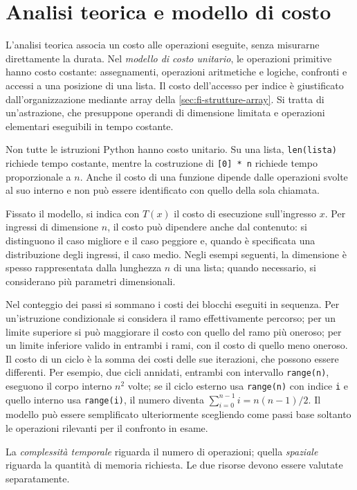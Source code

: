\section{Analisi teorica e modello di costo}
\label{sec:fi-complessita-modello}

L'analisi teorica associa un costo alle operazioni eseguite, senza
misurarne direttamente la durata. Nel \emph{modello di costo unitario},
le operazioni primitive hanno costo costante: assegnamenti,
operazioni aritmetiche e logiche, confronti e accessi a una posizione
di una lista. Il costo dell'accesso per indice è giustificato
dall'organizzazione mediante array della \cref{sec:fi-strutture-array}.
Si tratta di un'astrazione, che presuppone operandi di
dimensione limitata e operazioni elementari eseguibili in tempo
costante.

Non tutte le istruzioni Python hanno costo unitario. Su una lista,
\texttt{len(lista)} richiede tempo costante, mentre la costruzione di
\texttt{[0] * n} richiede tempo proporzionale a \(n\). Anche il costo
di una funzione dipende dalle operazioni svolte al suo interno e non
può essere identificato con quello della sola chiamata.

Fissato il modello, si indica con \(T(x)\) il costo di esecuzione
sull'ingresso \(x\). Per ingressi di dimensione \(n\), il costo può
dipendere anche dal contenuto: si distinguono il caso migliore e il
caso peggiore e, quando è specificata una distribuzione degli ingressi,
il caso medio. Negli esempi seguenti, la dimensione è spesso
rappresentata dalla lunghezza \(n\) di una lista; quando necessario,
si considerano più parametri dimensionali.

Nel conteggio dei passi si sommano i costi dei blocchi eseguiti in
sequenza. Per un'istruzione condizionale si considera il ramo
effettivamente percorso; per un limite superiore si può maggiorare
il costo con quello del ramo più oneroso; per un limite inferiore
valido in entrambi i rami, con il costo di quello meno oneroso.
Il costo di un ciclo è la somma dei costi delle sue iterazioni,
che possono essere differenti. Per esempio, due cicli annidati,
entrambi con intervallo \texttt{range(n)}, eseguono il corpo interno
\(n^2\) volte; se il ciclo esterno usa \texttt{range(n)} con indice
\texttt{i} e quello interno usa \texttt{range(i)}, il numero diventa
\(\sum_{i=0}^{n-1}i=n(n-1)/2\).
Il modello può essere semplificato ulteriormente scegliendo come passi
base soltanto le operazioni rilevanti per il confronto in esame.

La \emph{complessità temporale} riguarda il numero di operazioni;
quella \emph{spaziale} riguarda la quantità di memoria richiesta. Le
due risorse devono essere valutate separatamente.

